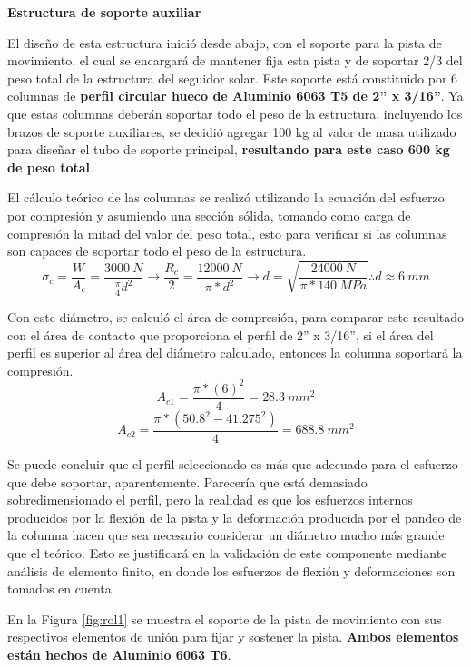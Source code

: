 \textbf{Estructura de soporte auxiliar}

El diseño de esta estructura inició desde abajo, con el soporte para la pista de movimiento, el cual se encargará de mantener fija esta pista y de soportar 2/3 del peso total de la estructura del seguidor solar. Este soporte está constituido por 6 columnas de \textbf{perfil circular hueco de Aluminio 6063 T5 de 2” x 3/16”}. Ya que estas columnas deberán soportar todo el peso de la estructura, incluyendo los brazos de soporte auxiliares, se decidió agregar 100 kg al valor de masa utilizado para diseñar el tubo de soporte principal, \textbf{resultando para este caso 600 kg de peso total}.

El cálculo teórico de las columnas se realizó utilizando la ecuación del esfuerzo por compresión y asumiendo una sección sólida, tomando como carga de compresión la mitad del valor del peso total, esto para verificar si las columnas son capaces de soportar todo el peso de la estructura.
\begin{equation}
    \sigma_c= \frac{W}{A_c}= \frac{3000\ N}{\frac{\pi}{4}d^2} \rightarrow \frac{R_c}{2}= \frac{12000\ N}{\pi*d^2} \rightarrow d= \sqrt{\frac{24000\ N}{\pi*140\ MPa}} \therefore d \approx 6\ mm
\end{equation}

Con este diámetro, se calculó el área de compresión, para comparar este resultado con el área de contacto que proporciona el perfil de 2” x 3/16”, si el área del perfil es superior al área del diámetro calculado, entonces la columna soportará la compresión.
\begin{equation}
    A_{c1}=\frac{\pi*(6)^2}{4}=28.3\ mm^2
\end{equation}
\begin{equation}
    A_{c2}= \frac{\pi*(50.8^2-41.275^2)}{4}=688.8\ mm^2
\end{equation}

Se puede concluir que el perfil seleccionado es más que adecuado para el esfuerzo que debe soportar, aparentemente. Parecería que está demasiado sobredimensionado el perfil, pero la realidad es que los esfuerzos internos producidos por la flexión de la pista y la deformación producida por el pandeo de la columna hacen que sea necesario considerar un diámetro mucho más grande que el teórico. Esto se justificará en la validación de este componente mediante análisis de elemento finito, en donde los esfuerzos de flexión y deformaciones son tomados en cuenta.

En la Figura \ref{fig:rol1} se muestra el soporte de la pista de movimiento con sus respectivos elementos de unión para fijar y sostener la pista. \textbf{Ambos elementos están hechos de Aluminio 6063 T6}.

